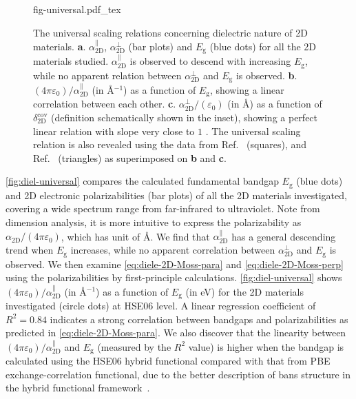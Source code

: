 \begin{figure}[!htbp]
\centering
{fig-universal.pdf_tex}
\caption{\label{fig:diel-universal} The universal scaling relations
  concerning dielectric nature of 2D materials.
  \textbf{a}. $\alpha_{\mathrm{2D}}^{\parallel}$,
  $\alpha_{\mathrm{2D}}^{\perp}$ (bar plots) and $E_{\mathrm{g}}$
  (blue dots) for all the 2D materials studied.
  $\alpha_{\mathrm{2D}}^{\parallel}$ is observed to descend with
  increasing $E_{\mathrm{g}}$, while no apparent relation between
  $\alpha_{\mathrm{2D}}^{\perp}$ and $E_{\mathrm{g}}$ is
  observed. \textbf{b}.
  $(4\pi \varepsilon_{0})/\alpha_{\mathrm{2D}}^{\parallel}$ (in
  \AA{}$^{-1}$) as a function of $E_{\mathrm{g}}$, showing a linear
  correlation between each other.  \textbf{c}.
  $\alpha_{\mathrm{2D}}^{\perp}/(\varepsilon_{0})$ (in \AA{}) as a
  function of $\delta_{\mathrm{2D}}^{\mathrm{cov}}$ (definition schematically shown
  in the inset), showing a perfect linear relation with slope very
  close to $1$ . The universal scaling relation is also revealed using
  the data from Ref.~\cite{Haastrup_2018_database} (squares), and
  Ref.~\cite{Mounet_2018_database} (triangles) as superimposed on
  \textbf{b} and \textbf{c}.  }
\end{figure}
\autoref{fig:diel-universal} compares the calculated fundamental bandgap
$E_{\mathrm{g}}$ (blue dots) and 2D electronic polarizabilities (bar
plots) of all the 2D materials investigated, covering a wide spectrum
range from far-infrared to ultraviolet.  Note from dimension analysis,
it is more intuitive to express the polarizability as
$\alpha_{\mathrm{2D}}/(4 \pi \varepsilon_{0})$, which has unit of
\AA{}. We find that $\alpha_{\mathrm{2D}}^{\parallel}$ has a general
descending trend when $E_{\mathrm{g}}$ increases, while no apparent
correlation between $\alpha_{\mathrm{2D}}^{\perp}$ and
$E_{\mathrm{g}}$ is observed.
%
We then examine
\autoref{eq:diele-2D-Moss-para} and \autoref{eq:diele-2D-Moss-perp}
using the polarizabilities by first-principle calculations.
\autoref{fig:diel-universal} shows
$(4 \pi \varepsilon_{0})/\alpha_{\mathrm{2D}}^{\parallel}$ (in
\AA{}$^{-1}$) as a function of $E_{\mathrm{g}}$ (in eV) for the 2D
materials investigated (circle dots) at HSE06 level.  A linear
regression coefficient of $R^{2}=0.84$ indicates a strong correlation
between bandgaps and polarizabilities as predicted in
\autoref{eq:diele-2D-Moss-para}.
We also discover that the linearity
between $(4 \pi \varepsilon_{0})/\alpha_{\mathrm{2D}}^{\parallel}$ and
$E_{\mathrm{g}}$ (measured by the $R^{2}$ value) is higher when the
bandgap is calculated using the HSE06 hybrid functional compared with
that from PBE exchange-correlation functional, due to the better description of bans structure in the hybrid functional framework~\cite{Heyd_2005_HSE_GAP}.



